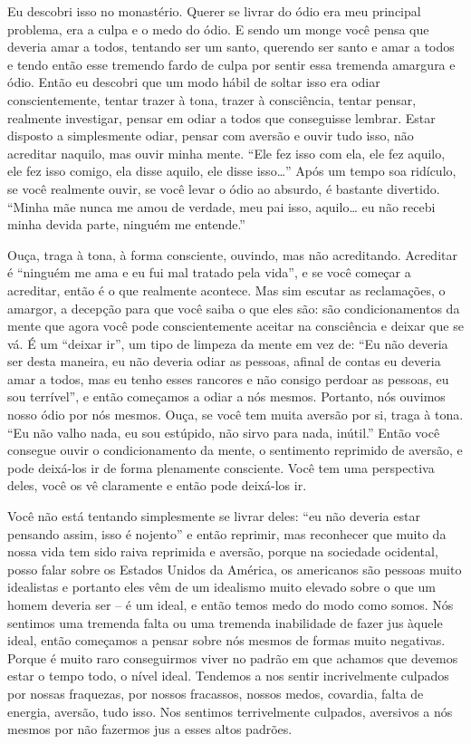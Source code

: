 Eu descobri isso no monastério. Querer se livrar do ódio era meu
principal problema, era a culpa e o medo do ódio. E sendo um monge você
pensa que deveria amar a todos, tentando ser um santo, querendo ser
santo e amar a todos e tendo então esse tremendo fardo de culpa por
sentir essa tremenda amargura e ódio. Então eu descobri que um modo
hábil de soltar isso era odiar conscientemente, tentar trazer à tona,
trazer à consciência, tentar pensar, realmente investigar, pensar em
odiar a todos que conseguisse lembrar. Estar disposto a simplesmente
odiar, pensar com aversão e ouvir tudo isso, não acreditar naquilo, mas
ouvir minha mente. “Ele fez isso com ela, ele fez aquilo, ele fez isso
comigo, ela disse aquilo, ele disse isso…” Após um tempo soa ridículo,
se você realmente ouvir, se você levar o ódio ao absurdo, é bastante
divertido. “Minha mãe nunca me amou de verdade, meu pai isso, aquilo…
eu não recebi minha devida parte, ninguém me entende.” 

Ouça, traga à tona, à forma consciente, ouvindo, mas não
acreditando. Acreditar é “ninguém me ama e eu fui mal tratado pela
vida”, e se você começar a acreditar, então é o que realmente acontece.
Mas sim escutar as reclamações, o amargor, a decepção para que você
saiba o que eles são: são condicionamentos da mente que agora você pode
conscientemente aceitar na consciência e deixar que se vá. É um “deixar
ir”, um tipo de limpeza da mente em vez de: “Eu não deveria ser desta
maneira, eu não deveria odiar as pessoas, afinal de contas eu deveria
amar a todos, mas eu tenho esses rancores e não consigo perdoar as
pessoas, eu sou terrível”, e então começamos a odiar a nós mesmos.
Portanto, nós ouvimos nosso ódio por nós mesmos. Ouça, se você tem
muita aversão por si, traga à tona. “Eu não valho nada, eu sou
estúpido, não sirvo para nada, inútil.” Então você consegue ouvir o
condicionamento da mente, o sentimento reprimido de aversão, e pode
deixá-los ir de forma plenamente consciente. Você tem uma perspectiva
deles, você os vê claramente e então pode deixá-los ir.

Você não está tentando simplesmente se livrar deles: “eu não deveria
estar pensando assim, isso é nojento” e então reprimir, mas reconhecer
que muito da nossa vida tem sido raiva reprimida e aversão, porque na
sociedade ocidental, posso falar sobre os Estados Unidos da América, os
americanos são pessoas muito idealistas e portanto eles vêm de um
idealismo muito elevado sobre o que um homem deveria ser – é um ideal,
e então temos medo do modo como somos. Nós sentimos uma tremenda falta
ou uma tremenda inabilidade de fazer jus àquele ideal, então começamos
a pensar sobre nós mesmos de formas muito negativas. Porque é muito
raro conseguirmos viver no padrão em que achamos que devemos estar o
tempo todo, o nível ideal. Tendemos a nos sentir incrivelmente culpados
por nossas fraquezas, por nossos fracassos, nossos medos, covardia,
falta de energia, aversão, tudo isso. Nos sentimos terrivelmente
culpados, aversivos a nós mesmos por não fazermos jus a esses altos
padrões.

